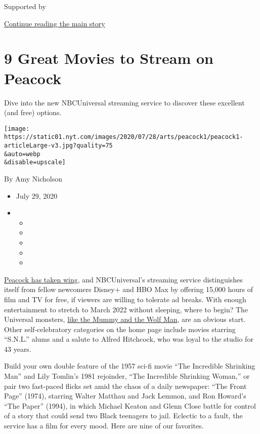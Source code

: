 Supported by

\protect\hyperlink{after-sponsor}{Continue reading the main story}

\hypertarget{9-great-movies-to-stream-on-peacock}{%
\section{9 Great Movies to Stream on
Peacock}\label{9-great-movies-to-stream-on-peacock}}

Dive into the new NBCUniversal streaming service to discover these
excellent (and free) options.

\texttt{[image: https://static01.nyt.com/images/2020/07/28/arts/peacock1/peacock1-articleLarge-v3.jpg?quality=75\\\&auto=webp\\\&disable=upscale]}

By Amy Nicholson

\begin{itemize}
\item
  July 29, 2020
\item
  \begin{itemize}
  \item
  \item
  \item
  \item
  \item
  \end{itemize}
\end{itemize}

\href{https://www.nytimes.com/2020/07/13/business/media/nbc-peacock-streaming.html}{Peacock
has taken wing}, and NBCUniversal's streaming service distinguishes
itself from fellow newcomers Disney+ and HBO Max by offering 15,000
hours of film and TV for free, if viewers are willing to tolerate ad
breaks. With enough entertainment to stretch to March 2022 without
sleeping, where to begin? The Universal monsters,
\href{https://www.nytimes.com/2020/02/27/movies/the-invisible-man-universal.html}{like
the Mummy and the Wolf Man}, are an obvious start. Other
self-celebratory categories on the home page include movies starring
``S.N.L.'' alums and a salute to Alfred Hitchcock, who was loyal to the
studio for 43 years.

Build your own double feature of the 1957 sci-fi movie ``The Incredible
Shrinking Man'' and Lily Tomlin's 1981 rejoinder, ``The Incredible
Shrinking Woman,'' or pair two fast-paced flicks set amid the chaos of a
daily newspaper: ``The Front Page'' (1974), starring Walter Matthau and
Jack Lemmon, and Ron Howard's ``The Paper'' (1994), in which Michael
Keaton and Glenn Close battle for control of a story that could send two
Black teenagers to jail. Eclectic to a fault, the service has a film for
every mood. Here are nine of our favorites.

